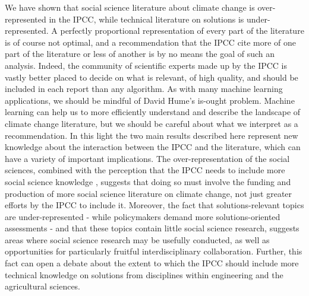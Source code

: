 \documentclass{article}
\begin{document}
\begin{linenumbers}
		
		We have shown that social science literature about climate change is over-represented in the IPCC, while technical literature on solutions is under-represented.
		A perfectly proportional representation of every part of the literature is of course not optimal, and a recommendation that the IPCC cite more of one part of the literature or less of another is by no means the goal of such an analysis. Indeed, the community of scientific experts made up by the IPCC is vastly better placed to decide on what is relevant, of high quality, and should be included in each report than any algorithm. 
		As with many machine learning applications, we should be mindful of David Hume's is-ought problem. 
		Machine learning can help us to more efficiently understand and describe the landscape of climate change literature, but we should be careful about what we interpret as a recommendation. In this light the two main results described here represent new knowledge about the interaction between the IPCC and the literature, which can have a variety of important implications. 
		The over-representation of the social sciences, combined with the perception that the IPCC needs to include more social science knowledge \cite{Victor2015}, suggests that doing so must involve the funding and production of more social science literature on climate change, not just greater efforts by the IPCC to include it. 
		Moreover, the fact that solutions-relevant topics are under-represented - while policymakers demand more solutions-oriented assessments - and that these topics contain little social science research, suggests areas where social science research may be usefully conducted, as well as opportunities for particularly fruitful interdisciplinary collaboration. Further, this fact can open a debate about the extent to which the IPCC should include more technical knowledge on solutions from disciplines within engineering and the agricultural sciences.
		

\end{linenumbers}
\end{document}
